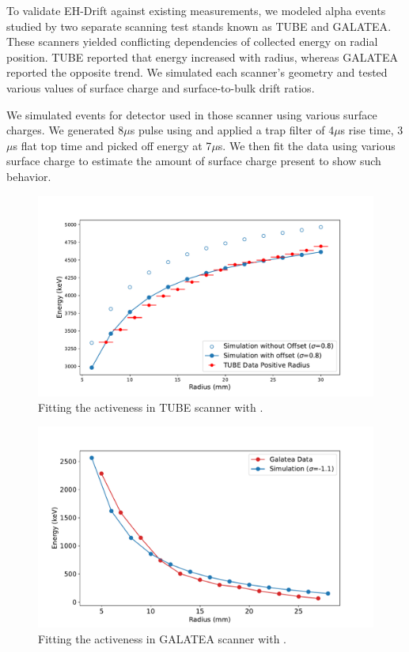 To validate EH-Drift against existing measurements, we modeled alpha events studied by two separate scanning test stands known as TUBE\cite{tube_paper} and GALATEA\cite{galatea_paper}. These scanners yielded conflicting dependencies of collected energy on radial position. TUBE reported that energy increased with radius, whereas GALATEA reported the opposite trend. We simulated each scanner’s geometry and tested various values of surface charge and surface-to-bulk drift ratios. 

We simulated events for detector used in those scanner using various surface charges. We generated 8$\mu$s pulse using {\ehd} and applied a trap filter of 4$\mu$s rise time, 3$\mu$s flat top time and picked off energy at 7$\mu$s. We then fit the data using various surface charge to estimate the amount of surface charge present to show such behavior.


\begin{figure}

\includegraphics[trim={0.3cm 0.1cm 1.7cm 0.1cm},clip,width=\linewidth]{ch5/figs/tube_fit.pdf}
\caption{Fitting the activeness in TUBE scanner with \ehd{}.}
\label{fig:tube_fit}
\end{figure}


\begin{figure}

\includegraphics[trim={0.3cm 0.1cm 1.7cm 0.1cm},clip,width=\linewidth]{ch5/figs/gal_fit.pdf}
\caption{Fitting the activeness in GALATEA scanner with \ehd{}.}
\label{fig:gal_fit}
\end{figure}

